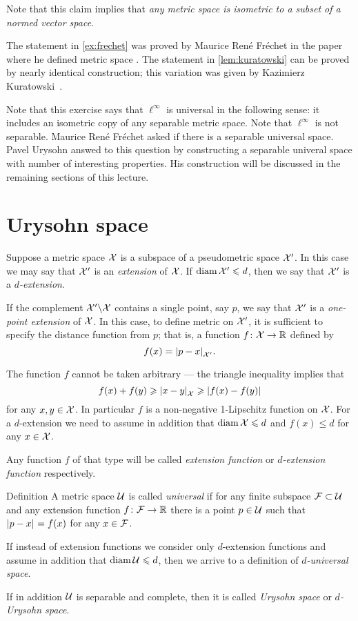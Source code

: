 Note that this claim implies that {}\emph{any metric space is isometric to a subset of a normed vector space}.

The statement in \ref{ex:frechet} was proved by Maurice René Fréchet in the paper where he defined metric space \cite{frechet}.
The statement in \ref{lem:kuratowski} can be proved by nearly identical construction;
this variation was given by Kazimierz Kuratowski~\cite{kuratowski}.

Note that this exercise says that $\ell^\infty$ is universal in the following sense: it includes an isometric copy of any separable metric space.
Note that $\ell^\infty$ is not separable.
Maurice René Fréchet asked if there is a separable universal space.
Pavel Urysohn answed to this question by constructing a separable univeral space with number of interesting properties.
His construction will be discussed in the remaining sections of this lecture.

\section{Urysohn space}
Suppose a metric space $\mathcal{X}$ is a subspace of a pseudometric space $\mathcal{X}'$.
In this case we may say that $\mathcal{X}'$ is an \emph{extension} of $\mathcal{X}$.
If $\operatorname{\rm diam}\nolimits\mathcal{X}'\leqslant d$, then we say that $\mathcal{X}'$ is a {}\emph{$d$-extension}.

If the complement $\mathcal{X}'\backslash \mathcal{X}$ contains a single point, say $p$, we say that $\mathcal{X}'$ is a \emph{one-point extension} of $\mathcal{X}$.
In this case, to define metric on $\mathcal{X}'$, it is sufficient to specify the distance function from $p$; that is, a function $f\colon\mathcal{X}\to\mathbb{R}$ defined by 
\[f(x)=\dist{p}{x}{\spc{X}'}.\]

The function $f$ cannot be taken arbitrary --- the triangle inequality implies that 
\[f(x)+f(y)\ge \dist{x}{y}{\spc{X}}\ge |f(x)-f(y)|\]
for any $x,y\in \mathcal{X}$.
In particular $f$ is a non-negative 1-Lipschitz function on $\mathcal{X}$.
For a $d$-extension we need to assume in addition that $\diam\spc{X}\z\le d$ and $f(x)\le d$ for any $x\in \mathcal{X}$.

Any function $f$ of that type will be called \emph{extension function}\label{page:extension function} or {}\emph{$d$-extension function} respectively.

\begin{thm}{Definition}\label{def:universal}
A metric space $\mathcal{U}$ is called \emph{universal}  if for any finite subspace $\mathcal{F}\subset\mathcal{U}$ and any extension function $f\colon\mathcal{F}\to\mathbb{R}$ there is a point $p\in \mathcal{U}$ such that $\dist{p}{x}{}=f(x)$ for any $x\in \mathcal{F}$.

If instead of extension functions we consider only $d$-extension functions and assume in addition that $\operatorname{\rm diam}\nolimits \mathcal{U}\leqslant d$, then we arrive to a definition of {}\emph{$d$-universal space}.

If in addition $\mathcal{U}$ is separable and complete, then it is called \emph{Urysohn space} or {}\emph{$d$-Urysohn space}.
\end{thm}


